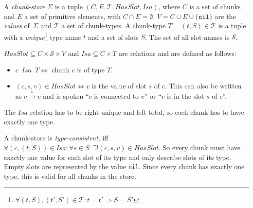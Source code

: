 \begin{definition}
A \emph{chunk-store} $\Sigma$ is a tuple $(C,E,\mathcal{T},HasSlot,Isa)$, where $C$ is a set of chunks and $E$ a set of primitive elements, with $C \cap E = \emptyset$. $V = C \cup E \cup \{ \mathtt{nil} \}$ are the \emph{values} of~$\Sigma$ and $\mathcal{T}$ a set of chunk-types. A chunk-type $T = (t,S) \in \mathcal{T}$ is a tuple with a \emph{unique}\footnote{$\forall (t,S), (t',S') \in \mathcal{T}: t = t' \Rightarrow S = S'$ } type name $t$ and a set of slots $S$. The set of all slot-names is $\mathcal{S}$. 

$HasSlot \subseteq C \times \mathcal{S} \times V$ and $Isa \subseteq C \times T$ are relations and are defined as follows:

\begin{itemize}
 \item $c \enspace Isa \enspace T \Leftrightarrow$ chunk $c$ is of type $T$.
 \item $(c,s,v) \in HasSlot \Leftrightarrow v$ is the value of slot $s$ of $c$. This can also be written as $c \overset{s}{\longrightarrow} v$ and is spoken ``$c$ is connected to $v$'' or ``$v$ is in the slot $s$ of $c$''.
\end{itemize}

The $Isa$ relation has to be right-unique and left-total, so each chunk has to have exactly one type.

% 


A chunk-store is \emph{type-consistent}, iff $\forall (c,(t,S)) \in Isa: \forall s \in S \enspace \exists ! (c,s,v) \in HasSlot$. So every chunk must have exactly one value for each slot of its type and only describe slots of its type. Empty slots are represented by the value \verb|nil|. Since every chunk has exactly one type, this is valid for all chunks in the store.


\end{definition}


